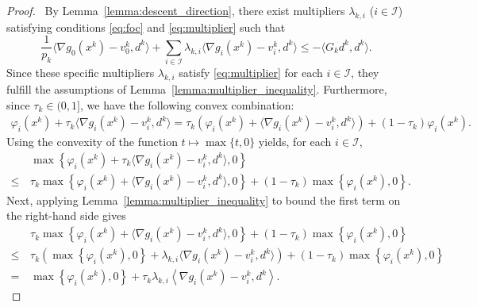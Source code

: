 \documentclass[11pt,a4paper]{article}
\theoremstyle{plain}
\begin{document}
\begin{proof}\,
By Lemma~\ref{lemma:descent_direction}, there exist multipliers $\lambda_{k,i}$ ($i \in \mathcal{I}$) satisfying conditions \eqref{eq:foc} and \eqref{eq:multiplier} such that
\begin{equation}\label{lem36_eq1}
    \frac{1}{p_k} \langle \nabla g_0(x^k) - v_0^k, d^k \rangle + \sum_{i \in \mathcal{I}} \lambda_{k,i} \langle\nabla g_i(x^k)-v_i^k, d^k\rangle \leq -\langle G_k d^k, d^k \rangle.
\end{equation}
Since these specific multipliers $\lambda_{k,i}$ satisfy \eqref{eq:multiplier} for each $i \in \mathcal{I}$, they fulfill the assumptions of Lemma~\ref{lemma:multiplier_inequality}. Furthermore, since $\tau_k \in (0, 1]$, we have the following convex combination:
\begin{equation*}
    \begin{aligned}
        \varphi_i(x^{k}) + \tau_k\langle\nabla g_i(x^k) - v_i^k, d^k\rangle = \tau_k\left(\varphi_i(x^{k}) + \langle\nabla g_i(x^k) - v_i^k, d^k\rangle\right) + (1-\tau_k)\varphi_i(x^{k}).
    \end{aligned}
\end{equation*}
Using the convexity of the function {$t \mapsto \max\{t,0\}$} yields, for each $i \in \mathcal{I}$,
\begin{equation*}
    \begin{aligned}
      &\max\left\{\varphi_i(x^{k}) + \tau_k\langle\nabla g_i(x^k) - v_i^k, d^k\rangle, 0\right\} \\ \leq \, & \tau_k\max\left\{\varphi_i(x^{k}) + \langle\nabla g_i(x^k) - v_i^k, d^k\rangle, 0\right\} + (1-\tau_k)\max\left\{\varphi_i(x^{k}), 0\right\}.  
    \end{aligned}
\end{equation*}
Next, applying Lemma~\ref{lemma:multiplier_inequality} to bound the first term on the right-hand side gives
\begin{equation*}
    \begin{aligned}&\tau_k\max\left\{\varphi_i(x^{k}) + \langle\nabla g_i(x^k) - v_i^k, d^k\rangle, 0\right\} + (1-\tau_k)\max\left\{\varphi_i(x^{k}), 0\right\} \\ \leq \,& \tau_k\left(\max\left\{\varphi_i(x^k), 0\right\} + \lambda_{k,i} \langle\nabla g_i(x^k) - v_i^k, d^k \rangle\right) + (1-\tau_k)\max\left\{\varphi_i(x^{k}), 0\right\} \\ = \,& \max\left\{\varphi_i(x^{k}), 0\right\} + \tau_k \lambda_{k,i} \left\langle \nabla g_i(x^k) - v_i^k, d^k \right\rangle.\end{aligned}
\end{equation*}


\end{proof}
\end{document}

